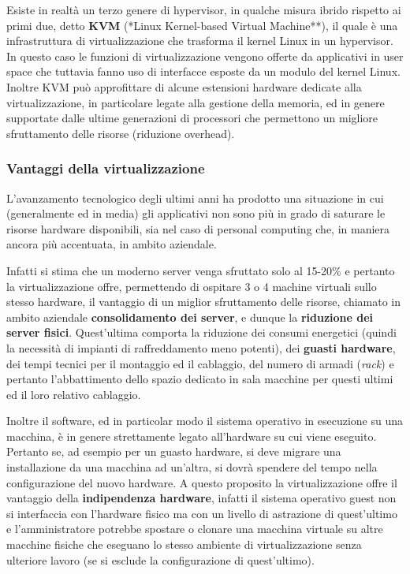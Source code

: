 \documentclass[italian,]{article}
\begin{document}
Esiste in realtà un terzo genere di hypervisor, in qualche misura ibrido
rispetto ai primi due, detto \textbf{KVM} (*Linux Kernel-based Virtual
Machine**), il quale è una infrastruttura di virtualizzazione che
trasforma il kernel Linux in un hypervisor. In questo caso le funzioni
di virtualizzazione vengono offerte da applicativi in user space che
tuttavia fanno uso di interfacce esposte da un modulo del kernel Linux.
Inoltre KVM può approfittare di alcune estensioni hardware dedicate alla
virtualizzazione, in particolare legate alla gestione della memoria, ed
in genere supportate dalle ultime generazioni di processori che
permettono un migliore sfruttamento delle risorse (riduzione overhead).

\subsubsection{Vantaggi della
virtualizzazione}\label{vantaggi-della-virtualizzazione}

L'avanzamento tecnologico degli ultimi anni ha prodotto una situazione
in cui (generalmente ed in media) gli applicativi non sono più in grado
di saturare le risorse hardware disponibili, sia nel caso di personal
computing che, in maniera ancora più accentuata, in ambito aziendale.

Infatti si stima che un moderno server venga sfruttato solo al 15-20\% e
pertanto la virtualizzazione offre, permettendo di ospitare 3 o 4
machine virtuali sullo stesso hardware, il vantaggio di un miglior
sfruttamento delle risorse, chiamato in ambito aziendale
\textbf{consolidamento dei server}, e dunque la \textbf{riduzione dei
server fisici}. Quest'ultima comporta la riduzione dei consumi
energetici (quindi la necessità di impianti di raffreddamento meno
potenti), dei \textbf{guasti hardware}, dei tempi tecnici per il
montaggio ed il cablaggio, del numero di armadi (\emph{rack}) e pertanto
l'abbattimento dello spazio dedicato in sala macchine per questi ultimi
ed il loro relativo cablaggio.

Inoltre il software, ed in particolar modo il sistema operativo in
esecuzione su una macchina, è in genere strettamente legato all'hardware
su cui viene eseguito. Pertanto se, ad esempio per un guasto hardware,
si deve migrare una installazione da una macchina ad un'altra, si dovrà
spendere del tempo nella configurazione del nuovo hardware. A questo
proposito la virtualizzazione offre il vantaggio della
\textbf{indipendenza hardware}, infatti il sistema operativo guest non
si interfaccia con l'hardware fisico ma con un livello di astrazione di
quest'ultimo e l'amministratore potrebbe spostare o clonare una macchina
virtuale su altre macchine fisiche che eseguano lo stesso ambiente di
virtualizzazione senza ulteriore lavoro (se si esclude la configurazione
di quest'ultimo).
\end{document}
